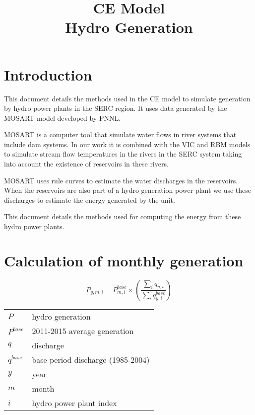 \documentclass[11pt, oneside]{article}   	%
\title{CE Model \\ Hydro Generation}
\date{}							%
\begin{document}
\maketitle
\section{Introduction}

This document details the methods used in the CE model to simulate generation by hydro power plants in the SERC region. It uses data generated by the MOSART model developed by PNNL.

MOSART \footnotemark is a computer tool that simulate water flows in river systems that include dam systems. In our work it is combined with the VIC and RBM models to simulate stream flow temperatures in the rivers in the SERC system taking into account the existence of reservoirs in these rivers.


MOSART uses rule curves to estimate the water discharges in the reservoirs. When the reservoirs are also part of a hydro generation power plant we use these discharges to estimate the energy generated by the unit.

This document details the methods used for computing the energy from these hydro power plants.

\section{Calculation of monthly generation}

\begin{equation}
P_{y, m, i} = P^{base}_{m,i} \times \left( \frac{\sum_{i} q_{y,i}}{\sum_{i}q^{base}_{y, i}}\right)
\end{equation}

\begin{tabular}{l l}
$P$ &  hydro generation \\
$P^{base}$ & 2011-2015 average generation \\
$q$ & discharge \\
$q^{base}$ & base period discharge (1985-2004) \\
$y$ & year\\
$m$ & month\\
$i$ &  hydro power plant index\\
\end{tabular}
\end{document}

